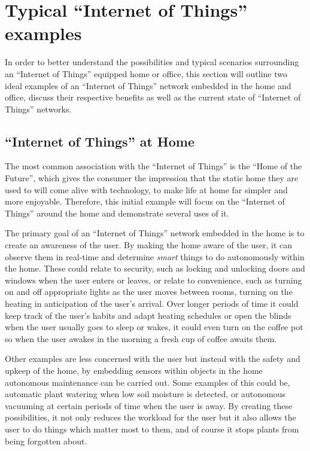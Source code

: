 \section{Typical ``Internet of Things'' examples} %
\label{sec:typical_}
In order to better understand the possibilities and typical scenarios surrounding an ``Internet of Things'' equipped home or office, this section will outline two ideal examples of an ``Internet of Things'' network embedded in the home and office, discuss their respective benefits as well as the current state of ``Internet of Things'' networks.

\subsection{``Internet of Things'' at Home} %
\label{sub:home}
The most common association with the ``Internet of Things'' is the ``Home of the Future'', which gives the consumer the impression that the static home they are used to will come alive with technology, to make life at home far simpler and more enjoyable. Therefore, this initial example will focus on the ``Internet of Things'' around the home and demonstrate several uses of it.

The primary goal of an ``Internet of Things'' network embedded in the home is to create an awareness of the user. By making the home aware of the user, it can observe them in real-time and determine \textit{smart} things to do autonomously within the home. These could relate to security, such as locking and unlocking doors and windows when the user enters or leaves, or relate to convenience, such as turning on and off appropriate lights as the user moves between rooms, turning on the heating in anticipation of the user's arrival. 
Over longer periods of time it could keep track of the user's habits and adapt heating schedules or open the blinds when the user usually goes to sleep or wakes, it could even turn on the coffee pot so when the user awakes in the morning a fresh cup of coffee awaits them.

Other examples are less concerned with the user but instead with the safety and upkeep of the home, by embedding sensors within objects in the home autonomous maintenance can be carried out. Some examples of this could be, automatic plant watering when low soil moisture is detected, or autonomous vacuuming at certain periods of time when the user is away.\cite{Roomba} By creating these possibilities, it not only reduces the workload for the user but it also allows the user to do things which matter most to them, and of course it stops plants from being forgotten about.

